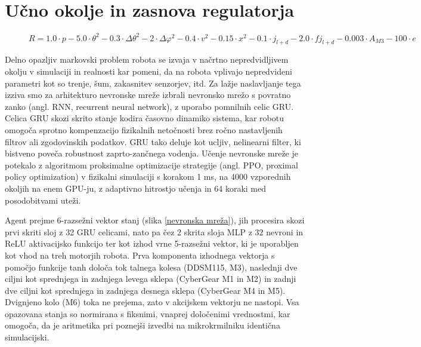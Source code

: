 \section{Učno okolje in zasnova regulatorja}

  \begin{figure}[t]
\begin{equation}
  R = 1.0\cdot p - 5.0\cdot\theta^2 - 0.3\cdot \Delta\theta^2 - 2\cdot \Delta \varphi^2 - 0.4\cdot v^2 - 0.15\cdot x^2 - 0.1\cdot j_{l+d} - 2.0\cdot fj_{l+d} - 0.003\cdot A_{M3} - 100\cdot e \label{nagrada enacba}
\end{equation}
\end{figure}
Delno opazljiv markovski problem robota se izvaja v na\-črt\-no nepredvidljivem okolju v simulaciji in realnosti kar pomeni, da na robota vplivajo nepredvideni parametri kot so trenje, šum, zakasnitev senzorjev, itd. Za lažje naslavljanje tega izziva smo za arhitekturo nevronske mreže izbrali nevronsko mrežo s povratno zanko (angl. RNN, recurrent neural network), z uporabo pomnilnih celic GRU. Celica GRU skozi skrito stanje kodira časovno dinamiko sistema, kar robotu omogoča sprotno kompenzacijo fizikalnih netočnosti brez ročno nastavljenih filtrov ali zgodovinskih podatkov. GRU tako deluje kot ucljiv, nelinearni filter, ki bistveno poveča robustnost zaprto-zančnega vodenja.
  Učenje nevronske mreže je potekalo z algoritmom proksimalne optimizacije strategije (angl. PPO, proximal policy optimization) v fizikalni simulaciji s korakom 1 ms, na 4000 vzporednih okoljih na enem GPU-ju, z adaptivno hitrostjo učenja in 64 koraki med posodobitvami uteži.
  
  
  Agent prejme 6-razsežni vektor stanj (slika \ref{nevronska mreža}), jih procesira skozi prvi skriti sloj z 32 GRU celicami, nato pa čez 2 skrita sloja MLP z 32 nevroni in ReLU aktivacijsko funkcijo ter kot izhod vrne 5-razsežni vektor, ki je uporabljen kot vhod na treh motorjih robota. Prva komponenta izhodnega vektorja s pomočjo funkcije tanh določa tok talnega kolesa (DDSM115, M3), naslednji dve ciljni kot sprednjega in zadnjega levega sklepa (CyberGear M1 in M2) in zadnji dve ciljni kot sprednjega in zadnjega desnega sklepa (CyberGear M4 in M5). Dvignjeno kolo (M6) toka ne prejema, zato v akcijskem vektorju ne nastopi. Vsa opazovana stanja so normirana s fiksnimi, vnaprej določenimi vrednostmi, kar omogoča, da je aritmetika pri poznejši izvedbi na mikrokrmilniku identična simulacijski. 

